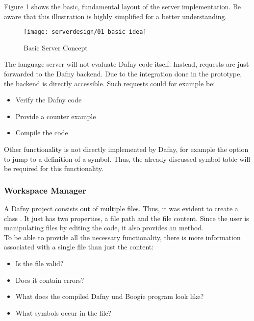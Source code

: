 Figure \ref{fig:server_basic_idea} shows the basic, fundamental layout of the server implementation.
Be aware that this illustration is highly simplified for a better understanding.\\

\begin{figure}[H]
    \centering
    \texttt{[image: serverdesign/01\_basic\_idea]}
    \caption{Basic Server Concept}
    \label{fig:server_basic_idea}
\end{figure}

The language server will not evaluate Dafny code itself.
Instead, requests are just forwarded to the Dafny backend.
Due to the integration done in the prototype, the backend is directly accessible.
Such requests could for example be:
\begin{itemize}
    \item Verify the Dafny code
    \item Provide a counter example
    \item Compile the code
\end{itemize}

Other functionality is not directly implemented by Dafny, for example the option to jump to a definition of a symbol.
Thus, the already discussed symbol table will be required for this functionality.\\


\subsubsection{Workspace Manager}
A Dafny project consists out of multiple  files.
Thus, it was evident to create a class .
It just has two properties, a file path and the file content.
Since the user is manipulating files by editing the code, it also provides an  method.\\

To be able to provide all the necessary functionality, there is more information associated with a single file than just the content:
\begin{itemize}
    \item Is the file valid?
    \item Does it contain errors?
    \item What does the compiled Dafny und Boogie program look like?
    \item What symbols occur in the file?
\end{itemize}


